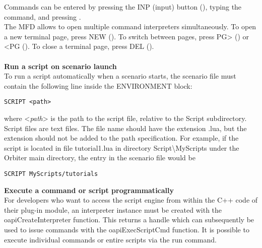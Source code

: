 \documentclass[Orbiter User Manual.tex]{subfiles}
\begin{document}
Commands can be entered by pressing the INP (input) button (\Shift{}), typing the command, and pressing \Enter.\\
The MFD allows to open multiple command interpreters simultaneously. To open a new terminal page, press NEW (\Shift{}). To switch between pages, press PG> (\Shift{}) or <PG (\Shift\keystroke{,}). To close a terminal page, press DEL (\Shift{}).\\
\\
\textbf{Run a script on scenario launch}\\
To run a script automatically when a scenario starts, the scenario file must contain the following line inside the ENVIRONMENT block:

\begin{lstlisting}[language=OSFS]
SCRIPT <path>
\end{lstlisting}

\noindent
where <\textit{path}> is the path to the script file, relative to the Script subdirectory. Script files are text files. The file name should have the extension .lua, but the extension should not be added to the path specification. For example, if the script is located in file tutorial1.lua in directory Script\textbackslash MyScripts under the Orbiter main directory, the entry in the scenario file would be

\begin{lstlisting}[language=OSFS]
SCRIPT MyScripts/tutorials
\end{lstlisting}

\noindent
\textbf{Execute a command or script programmatically}\\
For developers who want to access the script engine from within the C++ code of their plug-in module, an interpreter instance must be created with the oapiCreateInterpreter function. This returns a handle which can subsequently be used to issue commands with the oapiExecScriptCmd function. It is possible to execute individual commands or entire scripts via the run command.
\end{document}
